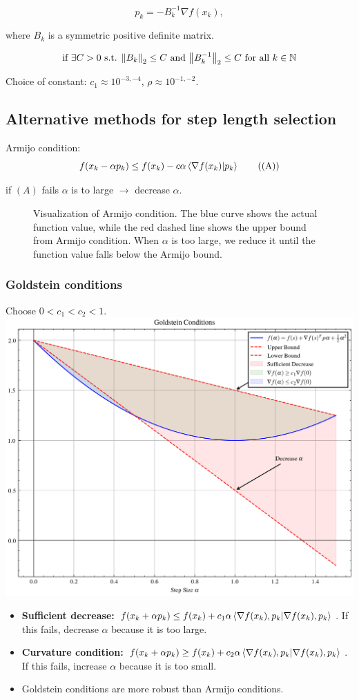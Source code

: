 \[
    p_k = - B_k^{-1} \nabla f(x_k),
\]

where $B_k$ is a symmetric positive definite matrix.

\[
    \text{if } \exists C > 0 \text{ s.t. } \norm{B_k}_2 \leq C \text{ and } \norm{B_k^{-1}}_2 \leq C \text{ for all } k \in \mathbb{N}
\]

Choice of constant: $c_1 \approx 10^{-3,-4}$, $\rho \approx 10^{-1,-2}$.

\subsection*{Alternative methods for step length selection}

Armijo condition:
\[
    f(x_k - \alpha p_k) \leq f(x_k) - c \alpha \ip{\nabla f(x_k)}{p_k} \tag{(A)}
\]

if $(A)$ fails $\alpha$ is to large $\to$ decrease $\alpha$.

\begin{figure}[H]
    \centering
    \caption{Visualization of Armijo condition. The blue curve shows the actual function value, while the red dashed line shows the upper bound from Armijo condition. When $\alpha$ is too large, we reduce it until the function value falls below the Armijo bound.}
\end{figure}

\subsubsection*{Goldstein conditions}
Choose $0 < c_1 < c_2 < 1$.
\includegraphics[scale=0.5]{figures/goldstein_conditions.png}
\begin{itemize}
    \item \textbf{Sufficient decrease:} $f(x_k + \alpha p_k) \leq f(x_k) + c_1 \alpha \ip{\nabla f(x_k), p_k}$. If this fails, decrease $\alpha$ because it is too large.
    \item \textbf{Curvature condition:} $f(x_k + \alpha p_k) \geq f(x_k) + c_2 \alpha \ip{\nabla f(x_k), p_k}$. If this fails, increase $\alpha$ because it is too small.
    \item Goldstein conditions are more robust than Armijo conditions.
\end{itemize}

